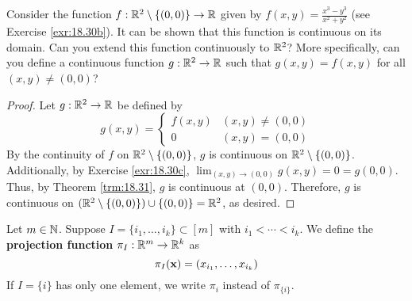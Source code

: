 \documentclass[../main.tex]{subfiles}
\begin{document}
\begin{exercise}\label{exr:18.33}
    Consider the function $f:\mathbb{R}^2\setminus\{(0,0)\}\to\mathbb{R}$ given by $f(x,y)=\frac{x^3-y^3}{x^2+y^2}$ (see Exercise \ref{exr:18.30b}). It can be shown that this function is continuous on its domain. Can you extend this function continuously to $\mathbb{R}^2$? More specifically, can you define a continuous function $g:\mathbb{R}^2\to\mathbb{R}$ such that $g(x,y)=f(x,y)$ for all $(x,y)\neq(0,0)$?
    \begin{proof}
        Let $g:\mathbb{R}^2\to\mathbb{R}$ be defined by
        \begin{equation*}
            g(x,y) =
            \begin{cases}
                f(x,y) & (x,y)\neq(0,0)\\
                0 & (x,y)=(0,0)
            \end{cases}
        \end{equation*}
        By the continuity of $f$ on $\mathbb{R}^2\setminus\{(0,0)\}$, $g$ is continuous on $\mathbb{R}^2\setminus\{(0,0)\}$. Additionally, by Exercise \ref{exr:18.30c}, $\lim_{(x,y)\to(0,0)}g(x,y)=0=g(0,0)$. Thus, by Theorem \ref{trm:18.31}, $g$ is continuous at $(0,0)$. Therefore, $g$ is continuous on $(\mathbb{R}^2\setminus\{(0,0)\})\cup\{(0,0)\}=\mathbb{R}^2$, as desired.
    \end{proof}
\end{exercise}

\begin{definition}\label{dfn:18.34}
    Let $m\in\mathbb{N}$. Suppose $I=\{i_1,\dots,i_k\}\subset[m]$ with $i_1<\cdots<i_k$. We define the \textbf{projection function} $\pi_I:\mathbb{R}^m\to\mathbb{R}^k$ as
    \begin{equation*}
        \pi_I(\mathbf{x}) = (x_{i_1},\dots,x_{i_k})
    \end{equation*}
    If $I=\{i\}$ has only one element, we write $\pi_i$ instead of $\pi_{\{i\}}$.
\end{definition}
\end{document}
